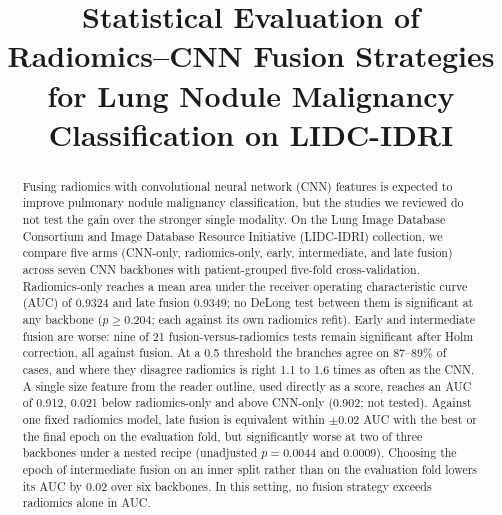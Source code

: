 \documentclass[conference]{IEEEtran}
\begin{document}
\title{Statistical Evaluation of Radiomics--CNN Fusion Strategies for Lung Nodule Malignancy Classification on LIDC-IDRI}

\author{
\and
{}
\and
{}
}

\maketitle

\begin{abstract}
Fusing radiomics with convolutional neural network (CNN) features is expected to improve pulmonary nodule malignancy classification, but the studies we reviewed do not test the gain over the stronger single modality. On the Lung Image Database Consortium and Image Database Resource Initiative (LIDC-IDRI) collection, we compare five arms (CNN-only, radiomics-only, early, intermediate, and late fusion) across seven CNN backbones with patient-grouped five-fold cross-validation. Radiomics-only reaches a mean area under the receiver operating characteristic curve (AUC) of 0.9324 and late fusion 0.9349; no DeLong test between them is significant at any backbone ($p\geq0.204$; each against its own radiomics refit). Early and intermediate fusion are worse: nine of 21 fusion-versus-radiomics tests remain significant after Holm correction, all against fusion. At a 0.5 threshold the branches agree on 87--89\% of cases, and where they disagree radiomics is right 1.1 to 1.6 times as often as the CNN. A single size feature from the reader outline, used directly as a score, reaches an AUC of 0.912, 0.021 below radiomics-only and above CNN-only (0.902; not tested). Against one fixed radiomics model, late fusion is equivalent within $\pm0.02$ AUC with the best or the final epoch on the evaluation fold, but significantly worse at two of three backbones under a nested recipe (unadjusted $p=0.0044$ and $0.0009$). Choosing the epoch of intermediate fusion on an inner split rather than on the evaluation fold lowers its AUC by 0.02 over six backbones. In this setting, no fusion strategy exceeds radiomics alone in AUC.
\end{abstract}
\end{document}
